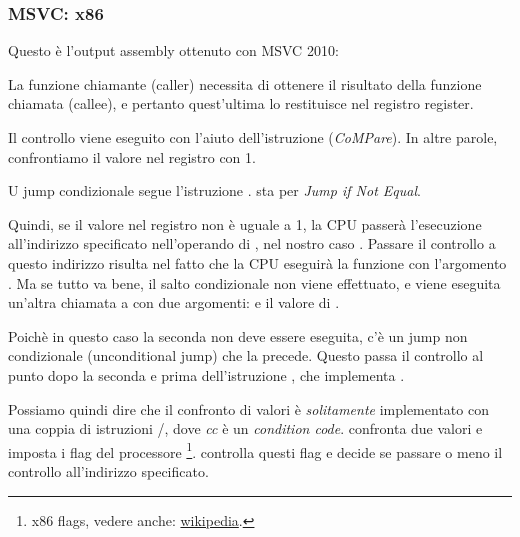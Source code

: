 \subsubsection{MSVC: x86}

Questo è l'output assembly ottenuto con MSVC 2010:



La funzione chiamante (\gls{caller}) \main necessita di ottenere il risultato della funzione chiamata (\gls{callee}), 
e pertanto quest'ultima lo restituisce nel registro \EAX register.

Il controllo viene eseguito con l'aiuto dell'istruzione  (\emph{CoMPare}). In altre parole, confrontiamo il valore nel registro \EAX con 1.

U jump condizionale \JNE segue l'istruzione \CMP. \JNE sta per \emph{Jump if Not Equal}.

Quindi, se il valore nel registro \EAX non è uguale a 1, la \ac{CPU} passerà l'esecuzione all'indirizzo specificato nell'operando di \JNE, nel nostro caso .
Passare il controllo a questo indirizzo risulta nel fatto che la \ac{CPU} eseguirà la funzione \printf con l'argomento .
Ma se tutto va bene, il salto condizionale non viene effettuato, e viene eseguita un'altra chiamata a \printf con due argomenti:  e il valore di .

Poichè in questo caso la seconda \printf non deve essere eseguita, c'è un jump non condizionale (unconditional jump) \JMP che la precede. 
Questo passa il controllo al punto dopo la seconda \printf e prima dell'istruzione , che implementa .

Possiamo quindi dire che il confronto di valori è \emph{solitamente} implementato con una coppia di istruzioni \CMP/\Jcc, dove \emph{cc} è un \emph{condition code}.
\CMP confronta due valori e imposta i flag del processore \footnote{x86 flags, vedere anche: \href{http://go.yurichev.com/17120}{wikipedia}.}.
\Jcc controlla questi flag e decide se passare o meno il controllo all'indirizzo specificato.

